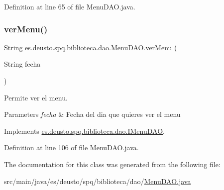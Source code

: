 Definition at line 65 of file Menu\+D\+A\+O.\+java.

\mbox{\label{classes_1_1deusto_1_1spq_1_1biblioteca_1_1dao_1_1_menu_d_a_o_ae05c2b05b530f98bcfc8ad1146f4efd7}} 
\subsubsection{\texorpdfstring{ver\+Menu()}{verMenu()}}
{\footnotesize\ttfamily String es.\+deusto.\+spq.\+biblioteca.\+dao.\+Menu\+D\+A\+O.\+ver\+Menu (\begin{DoxyParamCaption}\item[{String}]{fecha }\end{DoxyParamCaption})}

Permite ver el menu. 
\begin{DoxyParams}{Parameters}
{\em fecha} & Fecha del dia que quieres ver el menu \\
\hline
\end{DoxyParams}


Implements \mbox{\hyperlink{interfacees_1_1deusto_1_1spq_1_1biblioteca_1_1dao_1_1_i_menu_d_a_o_ac92176efdcf5f320225152392db8cb8a}{es.\+deusto.\+spq.\+biblioteca.\+dao.\+I\+Menu\+D\+AO}}.



Definition at line 106 of file Menu\+D\+A\+O.\+java.



The documentation for this class was generated from the following file\+:\begin{DoxyCompactItemize}
\item 
src/main/java/es/deusto/spq/biblioteca/dao/\mbox{\hyperlink{_menu_d_a_o_8java}{Menu\+D\+A\+O.\+java}}\end{DoxyCompactItemize}
